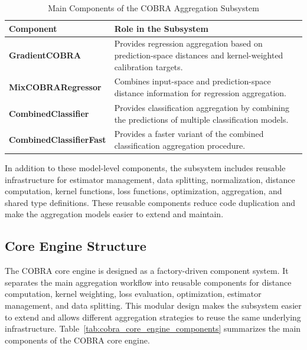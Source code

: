 \begin{table}[H]
      \centering
      \caption{Main Components of the COBRA Aggregation Subsystem}
      \label{tab:cobra_model_components}
      \begin{tabularx}{\textwidth}{lX}
            \toprule
            \textbf{Component}              & \textbf{Role in the Subsystem}                                             \\
            \midrule
            \textbf{GradientCOBRA}          &
            Provides regression aggregation based on prediction-space distances and kernel-weighted calibration targets. \\

            \textbf{MixCOBRARegressor}      &
            Combines input-space and prediction-space distance information for regression aggregation.                   \\

            \textbf{CombinedClassifier}     &
            Provides classification aggregation by combining the predictions of multiple classification models.          \\

            \textbf{CombinedClassifierFast} &
            Provides a faster variant of the combined classification aggregation procedure.                              \\
            \bottomrule
      \end{tabularx}
\end{table}

In addition to these model-level components, the subsystem includes reusable infrastructure for estimator management, data splitting, normalization, distance computation, kernel functions, loss functions, optimization, aggregation, and shared type definitions. These reusable components reduce code duplication and make the aggregation models easier to extend and maintain.


\subsection{Core Engine Structure}

\hs The COBRA core engine is designed as a factory-driven component system. It separates the main aggregation workflow into reusable components for distance computation, kernel weighting, loss evaluation, optimization, estimator management, and data splitting. This modular design makes the subsystem easier to extend and allows different aggregation strategies to reuse the same underlying infrastructure. Table~\ref{tab:cobra_core_engine_components} summarizes the main components of the COBRA core engine.

